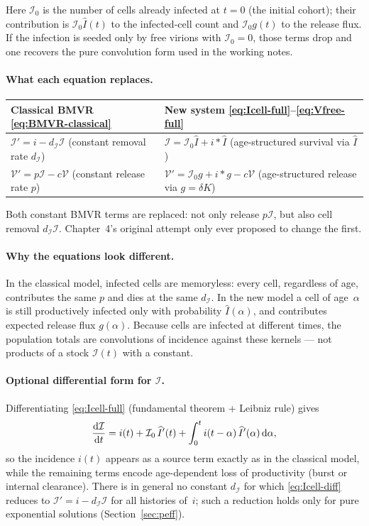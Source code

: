 \documentclass[11pt,a4paper]{article}
\newcommand{\dd}{{\rm d}}
\newcommand{\Ihat}{\widehat{I}}
\newcommand{\Icell}{\mathcal{I}}
\newcommand{\Vfree}{\mathcal{V}}
\newcommand{\ddt}[1]{\frac{\dd #1}{\dd t}}
\theoremstyle{plain}
\theoremstyle{definition}
\theoremstyle{remark}
\begin{document}
Here $\Icell_0$ is the number of cells already infected at $t=0$ (the initial
cohort); their contribution is $\Icell_0\Ihat(t)$ to the infected-cell count and
$\Icell_0 g(t)$ to the release flux. If the infection is seeded only by free
virions with $\Icell_0=0$, those terms drop and one recovers the pure convolution
form used in the working notes.

\paragraph{What each equation replaces.}
\begin{center}
\renewcommand{\arraystretch}{1.35}
\begin{tabular}{@{}p{}p{}@{}}
\toprule
Classical BMVR \eqref{eq:BMVR-classical} & New system \eqref{eq:Icell-full}--\eqref{eq:Vfree-full} \\
\midrule
$\Icell'=i-d_{\Icell}\Icell$
  (constant removal rate $d_{\Icell}$)
& $\Icell = \Icell_0\Ihat + i*\Ihat$
  (age-structured survival via $\Ihat$) \\[0.6em]
$\Vfree'=p\Icell-c\Vfree$
  (constant release rate $p$)
& $\Vfree' = \Icell_0 g + i*g - c\Vfree$
  (age-structured release via $g=\delta K$) \\
\bottomrule
\end{tabular}
\end{center}
Both constant BMVR terms are replaced: not only release $p\Icell$, but also cell
removal $d_{\Icell}\Icell$. Chapter~4's original attempt only ever proposed to
change the first.

\paragraph{Why the equations look different.}
In the classical model, infected cells are memoryless: every cell, regardless of
age, contributes the same $p$ and dies at the same $d_{\Icell}$. In the new model
a cell of age~$\alpha$ is still productively infected only with probability
$\Ihat(\alpha)$, and contributes expected release flux $g(\alpha)$. Because cells
are infected at different times, the population totals are convolutions of
incidence against these kernels --- not products of a stock $\Icell(t)$ with a
constant.

\paragraph{Optional differential form for $\Icell$.}
Differentiating \eqref{eq:Icell-full} (fundamental theorem + Leibniz rule) gives
\begin{equation}
\label{eq:Icell-diff}
\ddt{\Icell}
= i(t)
+\Icell_0\,\Ihat'(t)
+\int_0^t i(t-\alpha)\,\Ihat'(\alpha)\,\dd\alpha,
\end{equation}
so the incidence $i(t)$ appears as a source term exactly as in the classical
model, while the remaining terms encode age-dependent loss of productivity
(burst or internal clearance). There is in general no constant $d_{\Icell}$ for
which \eqref{eq:Icell-diff} reduces to $\Icell'=i-d_{\Icell}\Icell$ for all
histories of~$i$; such a reduction holds only for pure exponential solutions
(Section~\ref{sec:peff}).
\end{document}

